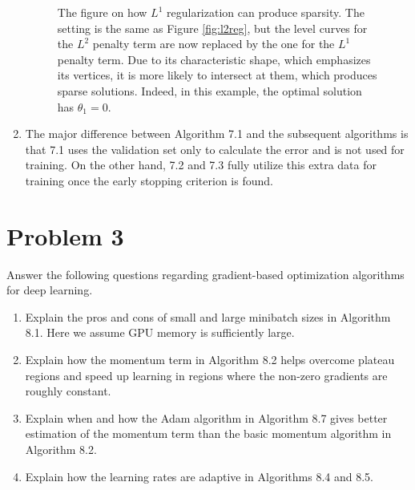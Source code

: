 \documentclass[
	12pt, %
]{../Template/fphw}
\begin{document}
\begin{enumerate}[label = (\arabic*)]
\begin{figure}
        \caption{The figure on how $L^1$ regularization can produce sparsity. The setting is the same as Figure \ref{fig:l2reg}, but the level curves for the $L^2$ penalty term are now replaced by the one for the $L^1$ penalty term. Due to its characteristic shape, which emphasizes its vertices, it is more likely to intersect at them, which produces sparse solutions. Indeed, in this example, the optimal solution has $\theta_1=0$.}
        \label{fig:l1sparse}
    \end{figure}
    \item The major difference between Algorithm 7.1 and the subsequent algorithms is that 7.1 uses the validation set only to calculate the error and is not used for training. On the other hand, 7.2 and 7.3 fully utilize this extra data for training once the early stopping criterion is found.
\end{enumerate}


\section*{Problem 3}

\begin{problem}
Answer the following questions regarding gradient-based optimization algorithms for deep
learning.
\begin{enumerate}[label=(\arabic*)]
\item Explain the pros and cons of small and large minibatch sizes in Algorithm 8.1. Here we assume GPU memory
is sufficiently large.
\item Explain how the momentum term in Algorithm 8.2 helps overcome plateau regions and speed up learning in
regions where the non-zero gradients are roughly constant.
\item Explain when and how the Adam algorithm in Algorithm 8.7 gives better estimation of the momentum term
than the basic momentum algorithm in Algorithm 8.2.
\item Explain how the learning rates are adaptive in Algorithms 8.4 and 8.5.
\end{enumerate}


\end{problem}
\end{document}
